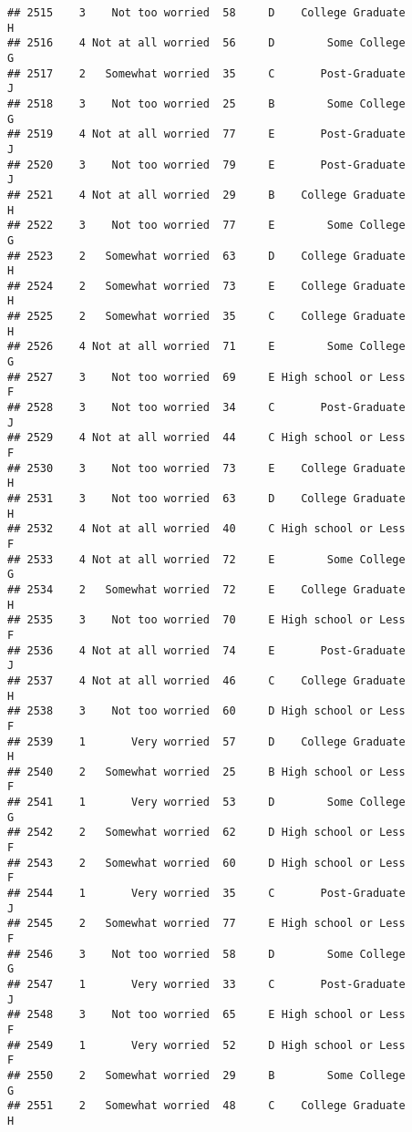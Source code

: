 \documentclass[
]{article}
\begin{document}
\begin{verbatim}
## 2515    3    Not too worried  58     D    College Graduate         H
## 2516    4 Not at all worried  56     D        Some College         G
## 2517    2   Somewhat worried  35     C       Post-Graduate         J
## 2518    3    Not too worried  25     B        Some College         G
## 2519    4 Not at all worried  77     E       Post-Graduate         J
## 2520    3    Not too worried  79     E       Post-Graduate         J
## 2521    4 Not at all worried  29     B    College Graduate         H
## 2522    3    Not too worried  77     E        Some College         G
## 2523    2   Somewhat worried  63     D    College Graduate         H
## 2524    2   Somewhat worried  73     E    College Graduate         H
## 2525    2   Somewhat worried  35     C    College Graduate         H
## 2526    4 Not at all worried  71     E        Some College         G
## 2527    3    Not too worried  69     E High school or Less         F
## 2528    3    Not too worried  34     C       Post-Graduate         J
## 2529    4 Not at all worried  44     C High school or Less         F
## 2530    3    Not too worried  73     E    College Graduate         H
## 2531    3    Not too worried  63     D    College Graduate         H
## 2532    4 Not at all worried  40     C High school or Less         F
## 2533    4 Not at all worried  72     E        Some College         G
## 2534    2   Somewhat worried  72     E    College Graduate         H
## 2535    3    Not too worried  70     E High school or Less         F
## 2536    4 Not at all worried  74     E       Post-Graduate         J
## 2537    4 Not at all worried  46     C    College Graduate         H
## 2538    3    Not too worried  60     D High school or Less         F
## 2539    1       Very worried  57     D    College Graduate         H
## 2540    2   Somewhat worried  25     B High school or Less         F
## 2541    1       Very worried  53     D        Some College         G
## 2542    2   Somewhat worried  62     D High school or Less         F
## 2543    2   Somewhat worried  60     D High school or Less         F
## 2544    1       Very worried  35     C       Post-Graduate         J
## 2545    2   Somewhat worried  77     E High school or Less         F
## 2546    3    Not too worried  58     D        Some College         G
## 2547    1       Very worried  33     C       Post-Graduate         J
## 2548    3    Not too worried  65     E High school or Less         F
## 2549    1       Very worried  52     D High school or Less         F
## 2550    2   Somewhat worried  29     B        Some College         G
## 2551    2   Somewhat worried  48     C    College Graduate         H

\end{verbatim}
\end{document}
